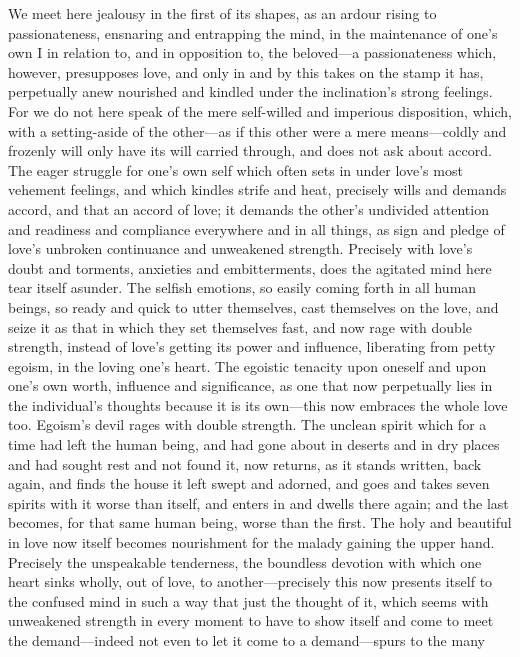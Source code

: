 \documentclass[12pt,a4paper]{book}
\begin{document}
We meet here jealousy in the first of its shapes, as an ardour rising to
passionateness, ensnaring and entrapping the mind, in the maintenance of
one's own I in relation to, and in opposition to, the beloved---a
passionateness which, however, presupposes love, and only in and by this
takes on the stamp it has, perpetually anew nourished and kindled under the
inclination's strong feelings. For we do not here speak of the mere
self-willed and imperious disposition, which, with a setting-aside of the
other---as if this other were a mere means---coldly and frozenly will only
have its will carried through, and does not ask about accord. The eager
struggle for one's own self which often sets in under love's most vehement
feelings, and which kindles strife and heat, precisely wills and demands
accord, and that an accord of love; it demands the other's undivided
attention and readiness and compliance everywhere and in all things, as
sign and pledge of love's unbroken continuance and unweakened strength.
Precisely with love's doubt and torments, anxieties and embitterments, does
the agitated mind here tear itself asunder. The selfish emotions, so easily
coming forth in all human beings, so ready and quick to utter themselves,
cast themselves on the love, and seize it as that in which they set
themselves fast, and now rage with double strength, instead of love's
getting its power and influence, liberating from petty egoism, in the
loving one's heart. The egoistic tenacity upon oneself and upon one's own
worth, influence and significance, as one that now perpetually lies in the
individual's thoughts because it is its own---this now embraces the whole
love too. Egoism's devil rages with double strength. The unclean spirit
which for a time had left the human being, and had gone about in deserts
and in dry places and had sought rest and not found it, now returns, as it
stands written, back again, and finds the house it left swept and adorned,
and goes and takes seven spirits with it worse than itself, and enters in
and dwells there again; and the last becomes, for that same human being,
worse than the first. The holy and beautiful in love now itself becomes
nourishment for the malady gaining the upper hand. Precisely the
unspeakable tenderness, the boundless devotion with which one heart sinks
wholly, out of love, to another---precisely this now presents itself to the
confused mind in such a way that just the thought of it, which seems with
unweakened strength in every moment to have to show itself and come to meet
the demand---indeed not even to let it come to a demand---spurs to the many
\end{document}
